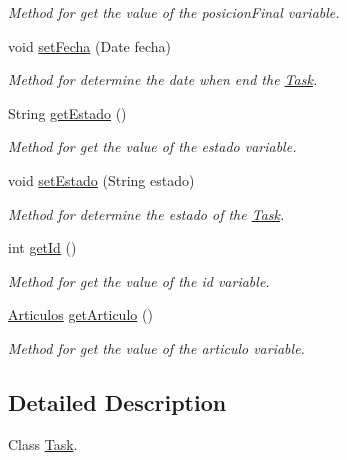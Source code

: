 \begin{DoxyCompactItemize}
\begin{DoxyCompactList}\small\item\em Method for get the value of the posicion\+Final variable. \end{DoxyCompactList}\item 
void \mbox{\hyperlink{classmodelo_1_1_task_af78482329f81c214c6359630ea077179}{set\+Fecha}} (Date fecha)
\begin{DoxyCompactList}\small\item\em Method for determine the date when end the \mbox{\hyperlink{classmodelo_1_1_task}{Task}}. \end{DoxyCompactList}\item 
String \mbox{\hyperlink{classmodelo_1_1_task_aaa504f1dfffb4eeba7bbe4904be070b5}{get\+Estado}} ()
\begin{DoxyCompactList}\small\item\em Method for get the value of the estado variable. \end{DoxyCompactList}\item 
void \mbox{\hyperlink{classmodelo_1_1_task_af09ff21352cab3a8d0939e6d4251d673}{set\+Estado}} (String estado)
\begin{DoxyCompactList}\small\item\em Method for determine the estado of the \mbox{\hyperlink{classmodelo_1_1_task}{Task}}. \end{DoxyCompactList}\item 
int \mbox{\hyperlink{classmodelo_1_1_task_afc746b903e969188b0ad624bb0691590}{get\+Id}} ()
\begin{DoxyCompactList}\small\item\em Method for get the value of the id variable. \end{DoxyCompactList}\item 
\mbox{\hyperlink{classmodelo_1_1_articulos}{Articulos}} \mbox{\hyperlink{classmodelo_1_1_task_a860a83d1aa53c826c49f14ab9469ed78}{get\+Articulo}} ()
\begin{DoxyCompactList}\small\item\em Method for get the value of the articulo variable. \end{DoxyCompactList}\end{DoxyCompactItemize}


\subsection{Detailed Description}
Class \mbox{\hyperlink{classmodelo_1_1_task}{Task}}. 


